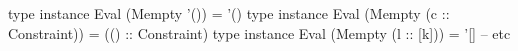 \begin{code}
type instance Eval
  (Mempty '()) = '()
type instance Eval
  (Mempty (c :: Constraint))
    = (() :: Constraint)
type instance Eval
  (Mempty (l :: [k])) = '[]
-- etc
\end{code}

